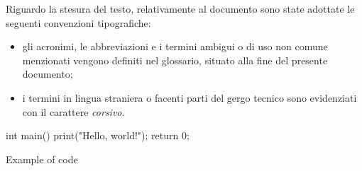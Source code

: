 Riguardo la stesura del testo, relativamente al documento sono state adottate le seguenti convenzioni tipografiche:
\begin{itemize}
	\item gli acronimi, le abbreviazioni e i termini ambigui o di uso non comune menzionati vengono definiti nel glossario, situato alla fine del presente documento;
	\item i termini in lingua straniera o facenti parti del gergo tecnico sono evidenziati con il carattere \textit{corsivo}.
\end{itemize}

\begin{listing}[H]
int main() {
    print("Hello, world!");
    return 0;
}
\caption{Example of code}
\label{listing:a}
\end{listing}

\newpage